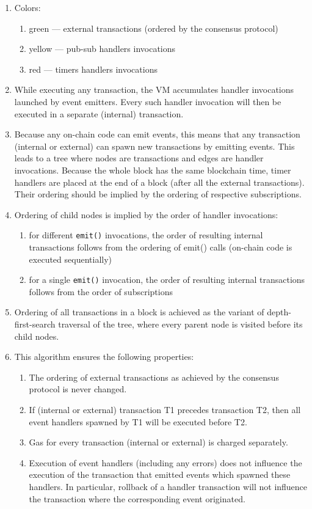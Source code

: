 \documentclass[a4paper]{article}
\newcommand{\code}[1]{{\small \texttt{#1}}}
\begin{document}
\begin{enumerate}
  \item Colors:
  \begin{enumerate}
    \item green --- external transactions (ordered by the consensus protocol)
    \item yellow --- pub-sub handlers invocations
    \item red --- timers handlers invocations
  \end{enumerate}
  \item While executing any transaction, the VM accumulates handler invocations launched by event emitters. Every such handler invocation will then be executed in a separate (internal) transaction.
  \item Because any on-chain code can emit events, this means that any transaction (internal or external) can spawn new transactions by emitting events. This leads to a tree where nodes are transactions and edges are handler invocations. Because the whole block has the same blockchain time, timer handlers are placed at the end of a block (after all the external transactions). Their ordering should be implied by the ordering of respective subscriptions.
  \item Ordering of child nodes is implied by the order of handler invocations:
  \begin{enumerate}
    \item for different \code{emit()} invocations, the order of resulting internal transactions follows from the ordering of emit() calls (on-chain code is executed sequentially)
    \item for a single \code{emit()} invocation, the order of resulting internal transactions follows from the order of subscriptions
  \end{enumerate}
  \item Ordering of all transactions in a block is achieved as the variant of depth-first-search traversal of the tree, where every parent node is visited before its child nodes.
  \item This algorithm ensures the following properties:
  \begin{enumerate}
    \item The ordering of external transactions as achieved by the consensus protocol is never changed.
    \item If (internal or external) transaction T1 precedes transaction T2, then all event handlers spawned by T1 will be executed before T2.
    \item Gas for every transaction (internal or external) is charged separately.
    \item Execution of event handlers (including any errors) does not influence the execution of the transaction that emitted events which spawned these handlers. In particular, rollback of a handler transaction will not influence the transaction where the corresponding event originated.
  \end{enumerate}
\end{enumerate}
\end{document}
